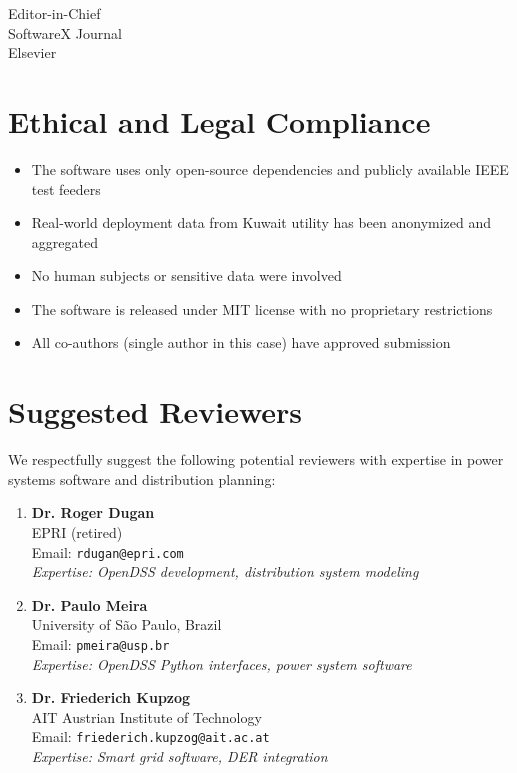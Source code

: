 \documentclass[11pt]{letter}
\begin{document}
\begin{letter}{
Editor-in-Chief\\
SoftwareX Journal\\
Elsevier
}
\section*{Ethical and Legal Compliance}

\begin{itemize}
    \item The software uses only open-source dependencies and publicly available IEEE test feeders
    \item Real-world deployment data from Kuwait utility has been anonymized and aggregated
    \item No human subjects or sensitive data were involved
    \item The software is released under MIT license with no proprietary restrictions
    \item All co-authors (single author in this case) have approved submission
\end{itemize}

\section*{Suggested Reviewers}

We respectfully suggest the following potential reviewers with expertise in power systems software and distribution planning:

\begin{enumerate}
    \item \textbf{Dr. Roger Dugan}\\
    EPRI (retired)\\
    Email: \texttt{rdugan@epri.com}\\
    \textit{Expertise: OpenDSS development, distribution system modeling}

    \item \textbf{Dr. Paulo Meira}\\
    University of São Paulo, Brazil\\
    Email: \texttt{pmeira@usp.br}\\
    \textit{Expertise: OpenDSS Python interfaces, power system software}

    \item \textbf{Dr. Friederich Kupzog}\\
    AIT Austrian Institute of Technology\\
    Email: \texttt{friederich.kupzog@ait.ac.at}\\
    \textit{Expertise: Smart grid software, DER integration}
\end{enumerate}


\end{letter}
\end{document}
